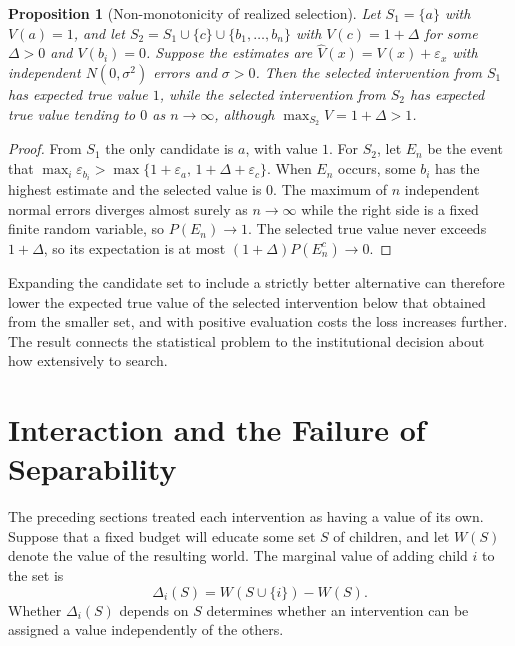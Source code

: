 \documentclass[11pt]{article}
\newtheorem{proposition}{Proposition}
\theoremstyle{definition}
\theoremstyle{remark}
\begin{document}
\begin{proposition}[Non-monotonicity of realized selection]
\label{prop:expansion}
Let $S_1=\{a\}$ with $V(a)=1$, and let $S_2=S_1\cup\{c\}\cup\{b_1,\dots,b_n\}$ with $V(c)=1+\Delta$ for some $\Delta>0$ and $V(b_i)=0$. Suppose the estimates are $\widehat V(x)=V(x)+\varepsilon_x$ with independent $N(0,\sigma^2)$ errors and $\sigma>0$. Then the selected intervention from $S_1$ has expected true value $1$, while the selected intervention from $S_2$ has expected true value tending to $0$ as $n\to\infty$, although $\max_{S_2}V=1+\Delta>1$.
\end{proposition}

\begin{proof}
From $S_1$ the only candidate is $a$, with value $1$. For $S_2$, let $E_n$ be the event that $\max_i\varepsilon_{b_i}>\max\{1+\varepsilon_a,\,1+\Delta+\varepsilon_c\}$. When $E_n$ occurs, some $b_i$ has the highest estimate and the selected value is $0$. The maximum of $n$ independent normal errors diverges almost surely as $n\to\infty$ while the right side is a fixed finite random variable, so $P(E_n)\to1$. The selected true value never exceeds $1+\Delta$, so its expectation is at most $(1+\Delta)P(E_n^{c})\to0$.
\end{proof}

Expanding the candidate set to include a strictly better alternative can therefore lower the expected true value of the selected intervention below that obtained from the smaller set, and with positive evaluation costs the loss increases further. The result connects the statistical problem to the institutional decision about how extensively to search.

\section{Interaction and the Failure of Separability}
\label{sec:interaction}

The preceding sections treated each intervention as having a value of its own. Suppose that a fixed budget will educate some set $S$ of children, and let $W(S)$ denote the value of the resulting world. The marginal value of adding child $i$ to the set is
\begin{equation}
\Delta_i(S)=W(S\cup\{i\})-W(S).
\label{eq:marginal}
\end{equation}
Whether $\Delta_i(S)$ depends on $S$ determines whether an intervention can be assigned a value independently of the others.
\end{document}
